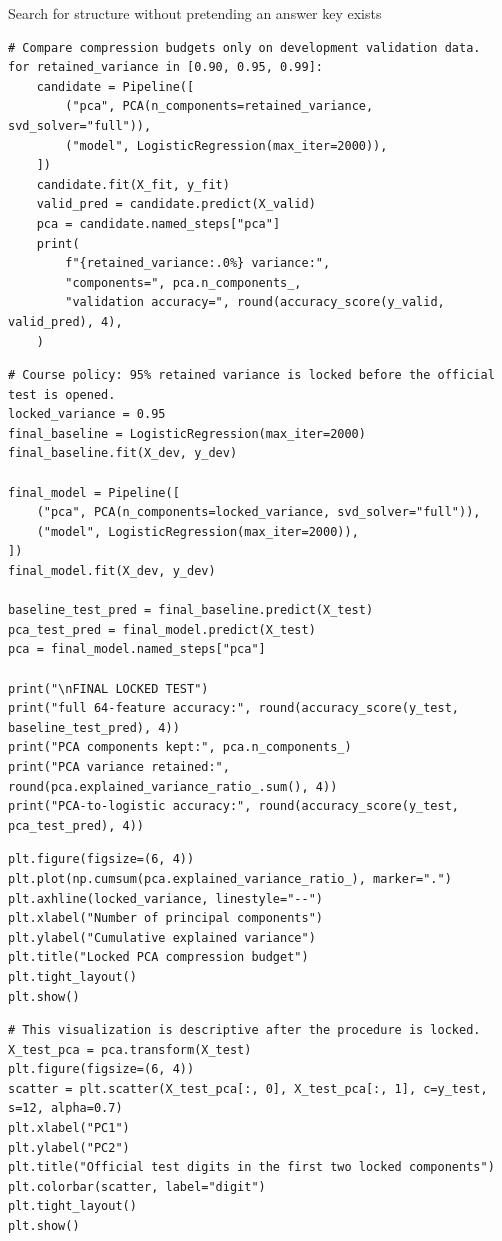 \begin{labproject}{Search for structure without pretending an answer key exists}
\begin{lstlisting}[style=mlpython]
# Compare compression budgets only on development validation data.
for retained_variance in [0.90, 0.95, 0.99]:
    candidate = Pipeline([
        ("pca", PCA(n_components=retained_variance, svd_solver="full")),
        ("model", LogisticRegression(max_iter=2000)),
    ])
    candidate.fit(X_fit, y_fit)
    valid_pred = candidate.predict(X_valid)
    pca = candidate.named_steps["pca"]
    print(
        f"{retained_variance:.0%} variance:",
        "components=", pca.n_components_,
        "validation accuracy=", round(accuracy_score(y_valid, valid_pred), 4),
    )
\end{lstlisting}

\begin{lstlisting}[style=mlpython]
# Course policy: 95% retained variance is locked before the official test is opened.
locked_variance = 0.95
final_baseline = LogisticRegression(max_iter=2000)
final_baseline.fit(X_dev, y_dev)

final_model = Pipeline([
    ("pca", PCA(n_components=locked_variance, svd_solver="full")),
    ("model", LogisticRegression(max_iter=2000)),
])
final_model.fit(X_dev, y_dev)

baseline_test_pred = final_baseline.predict(X_test)
pca_test_pred = final_model.predict(X_test)
pca = final_model.named_steps["pca"]

print("\nFINAL LOCKED TEST")
print("full 64-feature accuracy:", round(accuracy_score(y_test, baseline_test_pred), 4))
print("PCA components kept:", pca.n_components_)
print("PCA variance retained:", round(pca.explained_variance_ratio_.sum(), 4))
print("PCA-to-logistic accuracy:", round(accuracy_score(y_test, pca_test_pred), 4))
\end{lstlisting}

\begin{lstlisting}[style=mlpython]
plt.figure(figsize=(6, 4))
plt.plot(np.cumsum(pca.explained_variance_ratio_), marker=".")
plt.axhline(locked_variance, linestyle="--")
plt.xlabel("Number of principal components")
plt.ylabel("Cumulative explained variance")
plt.title("Locked PCA compression budget")
plt.tight_layout()
plt.show()
\end{lstlisting}

\begin{lstlisting}[style=mlpython]
# This visualization is descriptive after the procedure is locked.
X_test_pca = pca.transform(X_test)
plt.figure(figsize=(6, 4))
scatter = plt.scatter(X_test_pca[:, 0], X_test_pca[:, 1], c=y_test, s=12, alpha=0.7)
plt.xlabel("PC1")
plt.ylabel("PC2")
plt.title("Official test digits in the first two locked components")
plt.colorbar(scatter, label="digit")
plt.tight_layout()
plt.show()
\end{lstlisting}

\end{labproject}

